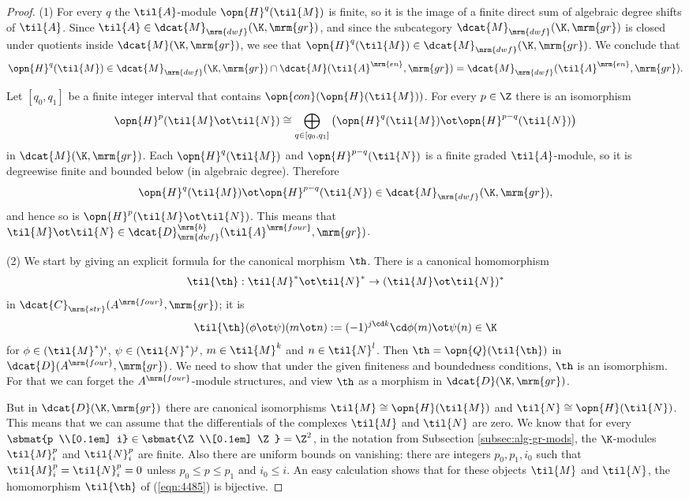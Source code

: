 \begin{proof} \mbox{}

\smallskip \noindent
(1) For every $q$ the $\til{A}$-module $\opn{H}^q(\til{M})$ is finite, so
it is the image of a finite direct sum of algebraic degree shifts of $\til{A}$. 
Since $\til{A} \in \dcat{M}_{\mrm{dwf}}(\K, \mrm{gr})$,
and since the subcategory
$\dcat{M}_{\mrm{dwf}}(\K, \mrm{gr})$
is closed under quotients inside $\dcat{M}(\K, \mrm{gr})$, we see that 
$\opn{H}^q(\til{M}) \in \dcat{M}_{\mrm{dwf}}(\K, \mrm{gr})$. 
We conclude that 
\[ \opn{H}^q(\til{M}) \in \dcat{M}_{\mrm{dwf}}(\K, \mrm{gr}) \cap 
\dcat{M}(\til{A}^{\mrm{en}}, \mrm{gr}) 
= \dcat{M}_{\mrm{dwf}}(\til{A}^{\mrm{en}}, \mrm{gr}) . \]

Let $[q_0, q_1]$ be a finite integer interval that contains 
$\opn{con}(\opn{H}(\til{M}))$. 
For every $p \in \Z$ there is an isomorphism 
\[ \opn{H}^p(\til{M} \ot \til{N}) \cong 
\bigoplus_{q \in [q_0, q_1]} \, 
\bigl( \opn{H}^q(\til{M}) \ot \opn{H}^{p - q}(\til{N}) \bigr) \]
in $\dcat{M}(\K, \mrm{gr})$. 
Each $\opn{H}^q(\til{M})$ and $\opn{H}^{p - q}(\til{N})$
is a finite graded $\til{A}$-module, so it is degreewise finite and bounded 
below (in algebraic degree). Therefore 
\[ \opn{H}^q(\til{M}) \ot \opn{H}^{p - q}(\til{N}) \in 
\dcat{M}_{\mrm{dwf}}(\K, \mrm{gr}) , \]
and hence so is $\opn{H}^p(\til{M} \ot \til{N})$. 
This means that 
$\til{M} \ot \til{N} \in 
\dcat{D}^{\mrm{b}}_{\mrm{dwf}}(\til{A}^{\mrm{four}}, \mrm{gr})$. 

\medskip \noindent 
(2) We start by giving an explicit formula for the canonical morphism $\th$. 
There is a canonical homomorphism 
\begin{equation} \label{eqn:4485}
\til{\th} : \til{M}^* \ot \til{N}^* \to (\til{M} \ot \til{N})^*
\end{equation}
in $\dcat{C}_{\mrm{str}}(A^{\mrm{four}}, \mrm{gr})$; 
it is 
\[ \til{\th}(\phi \ot \psi)(m \ot n) := 
(-1)^{j \cd k} \cd \phi(m) \ot \psi(n) \in \K \]
for $\phi \in (\til{M}^*)^i$, $\psi \in (\til{N}^*)^j$, 
$m \in \til{M}^k$ and $n \in \til{N}^l$.  
Then $\th = \opn{Q}(\til{\th})$ in 
$\dcat{D}(A^{\mrm{four}}, \mrm{gr})$.
We need to show that under the given finiteness and boundedness conditions, 
$\th$ is an isomorphism. For that we can forget the $A^{\mrm{four}}$-module 
structures, and view $\th$ as a morphism in 
$\dcat{D}(\K, \mrm{gr})$.

But in $\dcat{D}(\K, \mrm{gr})$ there are canonical isomorphisms 
$\til{M} \cong \opn{H}(\til{M})$ and 
$\til{N} \cong \opn{H}(\til{N})$.
This means that we can assume that the differentials of the complexes $\til{M}$ 
and $\til{N}$ are zero. We know that for every
$\sbmat{p \\[0.1em] i} \in \sbmat{\Z \\[0.1em] \Z} = \Z^2$,
in the notation from Subsection \ref{subsec:alg-gr-mods},
the $\K$-modules $\til{M}^p_i$ and  $\til{N}^p_i$ are finite. 
Also there are uniform bounds on vanishing: there are integers 
$p_0, p_1, i_0$ such that 
$\til{M}^p_i = \til{N}^p_i = 0$
unless $p_0 \leq p \leq p_1$ and $i_0 \leq i$. 
An easy calculation shows that for these objects $\til{M}$ and $\til{N}$, the 
homomorphism $\til{\th}$ of (\ref{eqn:4485}) is bijective. 
\end{proof}

